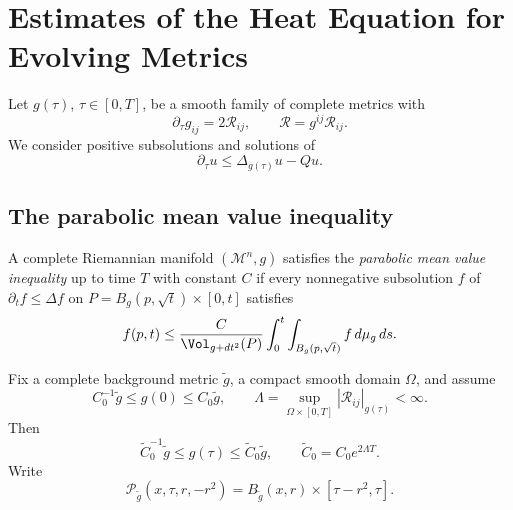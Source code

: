 \chapter[25]{Estimates of the Heat Equation for Evolving Metrics}
\label{ch:chow-iii-estimates-heat-equation-evolving-metrics}

Let \(g(\tau)\), \(\tau\in[0,T]\), be a smooth family of complete metrics
with
\[
 \partial_\tau g_{ij}=2\mathcal R_{ij},\qquad
 \mathcal R=g^{ij}\mathcal R_{ij}.
\]
We consider positive subsolutions and solutions of
\[
 \partial_\tau u\leq \Delta_{g(\tau)}u-Qu.
\]

\section{The parabolic mean value inequality}

\begin{definition}
\label{def:chow-iii-parabolic-mean-value-inequality}
A complete Riemannian manifold \((\mathcal M^n,g)\) satisfies the
\emph{parabolic mean value inequality} up to time \(T\) with constant \(C\)
if every nonnegative subsolution \(f\) of \(\partial_t f\leq\Delta f\) on
\(P=B_g(p,\sqrt t)\times[0,t]\) satisfies
\[
 f(p,t)\leq \frac{C}{\Vol_{g+dt^2}(P)}
 \int_0^t\int_{B_g(p,\sqrt t)}f\,d\mu_g\,ds.
\]
\end{definition}

Fix a complete background metric \(\widetilde g\), a compact smooth domain
\(\Omega\), and assume
\[
 C_0^{-1}\widetilde g\leq g(0)\leq C_0\widetilde g,
 \qquad
 \Lambda=\sup_{\Omega\times[0,T]}|\mathcal R_{ij}|_{g(\tau)}<\infty.
\]
Then
\[
 \widetilde C_0^{-1}\widetilde g\leq g(\tau)
 \leq\widetilde C_0\widetilde g,
 \qquad \widetilde C_0=C_0e^{2\Lambda T}.
\]
Write
\[
 \mathcal P_{\widetilde g}(x,\tau,r,-r^2)
 =B_{\widetilde g}(x,r)\times[\tau-r^2,\tau].
\]

